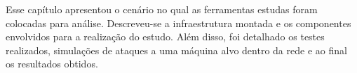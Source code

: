 Esse capítulo apresentou o cenário no qual as ferramentas estudas foram colocadas para análise. Descreveu-se a infraestrutura montada e os componentes envolvidos para a realização do estudo. Além disso, foi detalhado os testes realizados, simulações de ataques a uma máquina alvo dentro da rede e ao final os resultados obtidos. 
